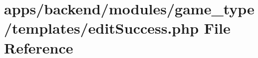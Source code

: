 \hypertarget{backend_2modules_2game__type_2templates_2edit_success_8php}{\section{apps/backend/modules/game\-\_\-type/templates/edit\-Success.php File Reference}
\label{backend_2modules_2game__type_2templates_2edit_success_8php}
}
